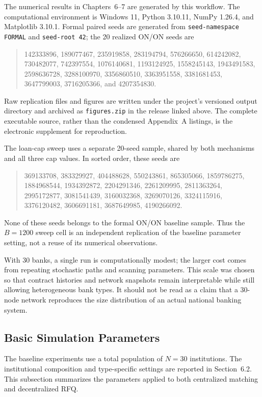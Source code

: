 The numerical results in Chapters~6--7 are generated by this workflow.
The computational environment is Windows 11,
Python 3.10.11, NumPy 1.26.4, and Matplotlib 3.10.1. Formal paired seeds
are generated from \texttt{seed-namespace FORMAL} and
\texttt{seed-root 42}; the 20 realized ON/ON seeds are
\begin{quote}\small\raggedright
142333896, 189077467, 235919858, 283194794, 576266650, 614242082,
730482077, 742397554, 1076140681, 1193124925, 1558245143, 1943491583,
2598636728, 3288100970, 3356860510, 3363951558, 3381681453, 3647799003,
3716205366, and 4207354830.
\end{quote}
Raw replication files and figures are written under the project's versioned
output directory and archived as \texttt{figures.zip} in the release linked
above. The complete executable source, rather than the condensed Appendix~A
listings, is the electronic supplement for reproduction.

The loan-cap sweep uses a separate 20-seed sample, shared by both mechanisms
and all three cap values. In sorted order, these seeds are
\begin{quote}\small\raggedright
369133708, 383329927, 404488628, 550243861, 865305066,
1859786275, 1884968544, 1934392872, 2204291346, 2261209995,
2811363264, 2995172877, 3081541439, 3160032368, 3269070126,
3324115916, 3376120482, 3606691181, 3687649985, 4190266092.
\end{quote}
None of these seeds belongs to the formal ON/ON baseline sample. Thus the
\(B=1200\) sweep cell is an independent replication of the baseline
parameter setting, not a reuse of its numerical observations.

With 30 banks, a single run is computationally modest; the larger cost
comes from repeating stochastic paths and scanning parameters. This
scale was chosen so that contract histories and network snapshots remain
interpretable while still allowing heterogeneous bank types. It should
not be read as a claim that a 30-node network reproduces the size
distribution of an actual national banking system.

\subsection{Basic Simulation Parameters}

The baseline experiments use a total population of
\(N=30\) institutions. The institutional composition and type-specific
settings are reported in Section~6.2. This subsection summarizes the
parameters applied to both centralized matching and decentralized RFQ.

